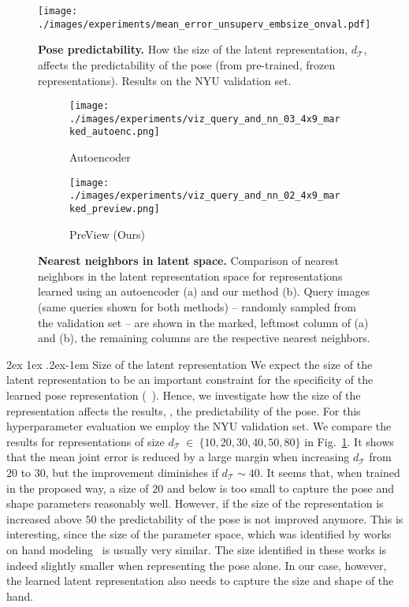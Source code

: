 \documentclass[10pt,twocolumn,letterpaper]{article}
\makeatletter
\renewcommand{\paragraph}{%
  \@startsection{paragraph}{4}%
  {\z@}{2ex \@plus 1ex \@minus .2ex}{-1em}%
  {\normalfont\normalsize\bfseries}%
}
\makeatother
\begin{document}
\begin{figure}[t]
  \centering
  \texttt{[image: ./images/experiments/mean\_error\_unsuperv\_embsize\_onval.pdf]}
  \caption[]{\textbf{Pose predictability.} 
  How the size of the latent representation, $d_{\mathcal{T}}$, 
  affects the predictability of the pose (from pre-trained, frozen representations). 
  Results on the NYU validation set.}
  \label{fig:embeddingsize}
\end{figure}\begin{figure*}[t]
  \centering
  \begin{subfigure}{0.48\linewidth}
    \texttt{[image: ./images/experiments/viz\_query\_and\_nn\_03\_4x9\_marked\_autoenc.png]}
    \caption{Autoencoder}
    \label{fig:nearestneighbors:autoenc}
  \end{subfigure}
  \quad
  \begin{subfigure}{0.48\linewidth}
    \texttt{[image: ./images/experiments/viz\_query\_and\_nn\_02\_4x9\_marked\_preview.png]}
    \caption{PreView (Ours)}
    \label{fig:nearestneighbors:preview}
  \end{subfigure}
  \caption{\textbf{Nearest neighbors in latent space.}
  Comparison of nearest neighbors in the latent representation space 
  for representations learned using an autoencoder (a) and our method (b).
  Query images (same queries shown for both methods) -- 
  randomly sampled from the validation set -- 
  are shown in the marked, leftmost column of (a) and (b), 
  the remaining columns are the respective nearest neighbors.
  }
  \label{fig:nearestneighbors}
\end{figure*}\paragraph{Size of the latent representation}
We expect the size of the latent representation to be an important constraint for
the specificity of the learned pose 
representation (\cf~\cite{Oberweger2015cvww_deepprior,Tekin2016bmvc_structuredpose}).
Hence, we investigate how the size of the 
representation affects the results, 
\ie, the predictability of the pose.
For this hyperparameter evaluation we employ the NYU validation set.
We compare the results for representations of size 
$d_{\mathcal{T}}~\in~\{10, 20, 30, 40, 50, 80 \}$ in Fig.~\ref{fig:embeddingsize}.
It shows that the mean joint error is reduced by a large margin when increasing 
$d_{\mathcal{T}}$ from $20$ to $30$,
but the improvement diminishes 
if $d_{\mathcal{T}} \sim 40$.
It seems that, when trained in the proposed way, 
a size of $20$ and below is too small to capture the 
pose and shape parameters reasonably well.
However, if the size of the representation is increased above $50$ 
the predictability of the pose is not improved anymore.
This is interesting, since the size of the parameter space,
which was identified by works on hand 
modeling~\cite{Albrecht03handmodels,Lin2000_handconstraints}
is usually very similar. 
The size identified in these works is indeed slightly smaller when representing the pose alone.
In our case, however, the learned latent representation also 
needs to capture the size and shape of the hand.
\end{document}
